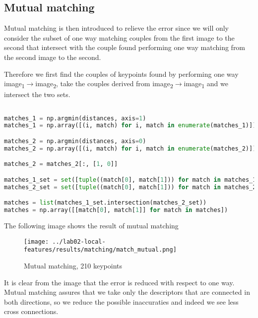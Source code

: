 \documentclass{ETHExercise}
\begin{document}
\subsection{Mutual matching}

Mutual matching is then introduced to relieve the error since 
we will only consider the subset of one way matching couples from the first
image to the second that intersect with the couple found performing one
way matching from the second image to the second.

Therefore we first find the couples of keypoints found by performing 
one way image\textsubscript{1}$\rightarrow$image\textsubscript{2}, take
the couples derived from  image\textsubscript{2}$\rightarrow$image\textsubscript{1}
and we intersect the two sets.

\begin{lstlisting}[language=Python, caption=Mutual matching]

matches_1 = np.argmin(distances, axis=1)
matches_1 = np.array([(i, match) for i, match in enumerate(matches_1)])

matches_2 = np.argmin(distances, axis=0)
matches_2 = np.array([(i, match) for i, match in enumerate(matches_2)])

matches_2 = matches_2[:, [1, 0]]

matches_1_set = set([tuple((match[0], match[1])) for match in matches_1])
matches_2_set = set([tuple((match[0], match[1])) for match in matches_2])

matches = list(matches_1_set.intersection(matches_2_set))
matches = np.array([[match[0], match[1]] for match in matches])
\end{lstlisting}

The following image shows the result of mutual matching

\begin{figure}[!h]
  \centering
  \texttt{[image: ../lab02-local-features/results/matching/match\_mutual.png]}
  \caption{Mutual matching, 210 keypoints}
\end{figure}

It is clear from the image that the error is reduced with respect to one way.
Mutual matching assures that we take only the descriptors that are connected 
in both directions, so we reduce the possible inaccuraties and indeed we see less
cross connections.
\end{document}
